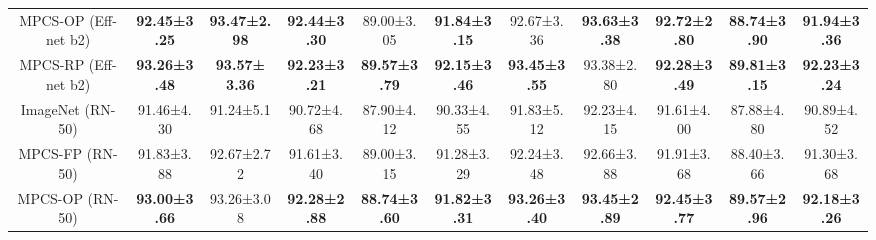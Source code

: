 \documentclass[conference]{IEEEtran}
\begin{document}
\begin{table*}[ht]
\begin{adjustbox}{max width=\textwidth}
\begin{tabular}{c|cccc|c|cccc|c}
MPCS-OP (Eff-net b2)                                        & \multicolumn{1}{c|}{\textbf{92.45±3.25}} & \multicolumn{1}{c|}{\textbf{93.47±2.98}}                         & \multicolumn{1}{c|}{{\color[HTML]{1E1E1E} \textbf{92.44±3.30}}} & {\color[HTML]{1E1E1E} 89.00±3.05}          & \textbf{91.84±3.15}    & \multicolumn{1}{c|}{92.67±3.36}          & \multicolumn{1}{c|}{\textbf{93.63±3.38}} & \multicolumn{1}{c|}{\textbf{92.72±2.80}} & \textbf{88.74±3.90} & \textbf{91.94±3.36}                                   \\
MPCS-RP (Eff-net b2)                                        & \multicolumn{1}{c|}{\textbf{93.26±3.48}} & \multicolumn{1}{c|}{{\color[HTML]{1E1E1E} \textbf{93.57± 3.36}}} & \multicolumn{1}{c|}{{\color[HTML]{1E1E1E} \textbf{92.23±3.21}}} & {\color[HTML]{1E1E1E} \textbf{89.57±3.79}} & \textbf{92.15±3.46}    & \multicolumn{1}{c|}{\textbf{93.45±3.55}} & \multicolumn{1}{c|}{93.38±2.80}          & \multicolumn{1}{c|}{\textbf{92.28±3.49}} & \textbf{89.81±3.15} & \textbf{92.23±3.24}                                   \\
ImageNet (RN-50)                                            & \multicolumn{1}{c|}{91.46±4.30}          & \multicolumn{1}{c|}{91.24±5.1}                                   & \multicolumn{1}{c|}{90.72±4.68}                                 & 87.90±4.12                                 & 90.33±4.55             & \multicolumn{1}{c|}{91.83±5.12}          & \multicolumn{1}{c|}{92.23±4.15}          & \multicolumn{1}{c|}{91.61±4.00}          & 87.88±4.80          & 90.89±4.52                                            \\
MPCS-FP (RN-50)                                             & \multicolumn{1}{c|}{91.83±3.88}          & \multicolumn{1}{c|}{92.67±2.72}                                  & \multicolumn{1}{c|}{91.61±3.40}                                 & 89.00±3.15                                 & 91.28±3.29             & \multicolumn{1}{c|}{92.24±3.48}          & \multicolumn{1}{c|}{92.66±3.88}          & \multicolumn{1}{c|}{91.91±3.68}          & 88.40±3.66          & 91.30±3.68                                            \\
MPCS-OP (RN-50)                                             & \multicolumn{1}{c|}{\textbf{93.00±3.66}} & \multicolumn{1}{c|}{93.26±3.08}                                  & \multicolumn{1}{c|}{{\color[HTML]{1E1E1E} \textbf{92.28±2.88}}} & {\color[HTML]{1E1E1E} \textbf{88.74±3.60}} & \textbf{91.82±3.31}    & \multicolumn{1}{c|}{\textbf{93.26±3.40}} & \multicolumn{1}{c|}{\textbf{93.45±2.89}} & \multicolumn{1}{c|}{\textbf{92.45±3.77}} & \textbf{89.57±2.96} & \textbf{92.18±3.26}                                   \\

\end{tabular}
\end{adjustbox}
\end{table*}
\end{document}
